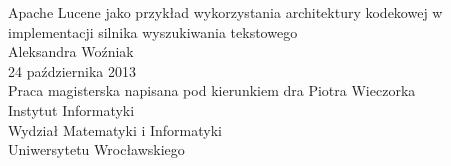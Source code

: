 \begin{titlepage}

\begin{spacing}{2}

\begin{center}
 \vspace*{5cm}
 {\LARGE Apache Lucene jako przykład wykorzystania architektury kodekowej w implementacji silnika wyszukiwania tekstowego}
 \\[0.75cm]
 {\Large Aleksandra Woźniak}
 \\[0.3cm]
 {\large 24 października 2013}
 \\[2.5cm]
 {\large Praca magisterska napisana pod kierunkiem dra Piotra Wieczorka
 \\[4cm]
 Instytut Informatyki\\
 Wydział Matematyki i Informatyki \\
 Uniwersytetu Wrocławskiego}

\end{center}

\end{spacing}

\end{titlepage}